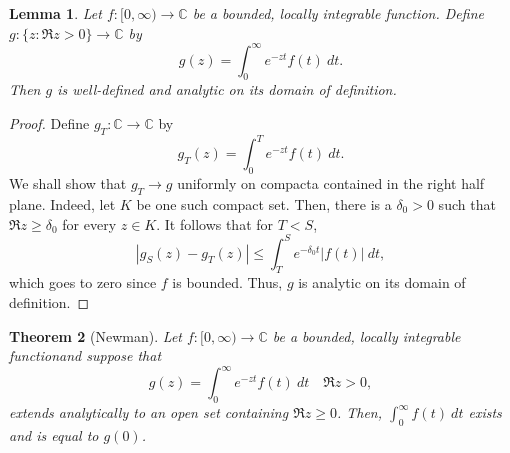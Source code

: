 \documentclass[12pt]{article}
\theoremstyle{thmstyle}
\newtheorem{theorem}{Theorem}[section]
\newtheorem{lemma}[theorem]{Lemma}
\theoremstyle{defstyle}
\newcommand{\bbC}{\mathbb{C}}
\renewcommand{\le}{\leqslant}
\renewcommand{\ge}{\geqslant}
\begin{document}
\begin{lemma}
    Let $f:[0,\infty)\to\bbC$ be a bounded, locally integrable function. Define $g:\{z\colon\Re z > 0\}\to\bbC$ by 
    \begin{equation*}
        g(z) = \int_0^\infty e^{-zt}f(t)~dt.
    \end{equation*}
    Then $g$ is well-defined and analytic on its domain of definition.
\end{lemma}
\begin{proof}
    Define $g_T:\bbC\to\bbC$ by 
    \begin{equation*}
        g_T(z) = \int_0^T e^{-zt} f(t)~dt.
    \end{equation*}
    We shall show that $g_T\to g$ uniformly on compacta contained in the right half plane. Indeed, let $K$ be one such compact set. Then, there is a $\delta_0 > 0$ such that $\Re z\ge\delta_0$ for every $z\in K$. It follows that for $T < S$, 
    \begin{equation*}
        |g_S(z) - g_T(z)|\le\int_T^S e^{-\delta_0t}|f(t)|~dt,
    \end{equation*}
    which goes to zero since $f$ is bounded. Thus, $g$ is analytic on its domain of definition.
\end{proof}

\begin{theorem}[Newman]
    Let $f:[0,\infty)\to\bbC$ be a bounded, locally integrable functionand suppose that 
    \begin{equation*}
        g(z) = \int_0^\infty e^{-zt}f(t)~dt\quad\Re z > 0,
    \end{equation*}
    extends analytically to an open set containing $\Re z\ge 0$. Then, $\displaystyle\int_0^\infty f(t)~dt$ exists and is equal to $g(0)$.
\end{theorem}
\end{document}

